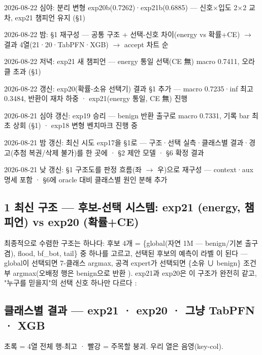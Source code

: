 2026-08-22 심야: 분리 변형 exp20b(0.7262)·exp21b(0.6885) — 신호×입도 2×2 교차, exp21 챔피언 유지 (§1)

2026-08-22 밤: §1 재구성 — 공통 구조 +\allowbreak{} 선택-신호 차이(energy vs 확률+\allowbreak{}CE)  \ensuremath{\rightarrow}  결과 4열(21·20·TabPFN·XGB)  \ensuremath{\rightarrow}  accept 차트 순

2026-08-22 저녁: exp21 새 챔피언 — energy 통일 선택(CE 無) macro 0.7411, 오라클 초과 (§1)

2026-08-22 갱신: exp20(확률-소유 선택기) 결과 §1 추가 — macro 0.7235·inf 최고 0.3484, 반환이 재차 하중 · exp21(energy 통일, CE 無) 진행

2026-08-21 심야 갱신: exp19 승리 — benign 반환 출구로 macro 0.7331, 기록 bar 최초 상회 (§1) · exp18 변형 벤치마크 진행 중

2026-08-21 밤 갱신: 최신 시도 exp17을 §1로 — 구조·선택 실측·클래스별 결과·경고(추첨 복권/\allowbreak{}삭제 불가)를 한 곳에 · §2 제안 모델 · §6 확정 결과

2026-08-21 낮 갱신: §1 구조도를 판정 흐름(좌 \ensuremath{\rightarrow} 우)으로 재구성 — context·aux 명세 포함 · §6에 oracle 대비 클래스별 원인 분해 추가

\subsection*{1 최신 구조 — 후보-선택 시스템: exp21 (energy, 챔피언) vs exp20 (확률+\allowbreak{}CE)}
최종적으로 수렴한 구조는 하나다: 후보 4개 =\allowbreak{} \{global(자연 1M — benign/\allowbreak{}기본 출구 겸), flood, bf\_\allowbreak{}bot, tail\} 중 하나를 고르고, 선택된 후보의 예측이 라벨 이 된다 — global이 선택되면 7-클래스 argmax, 공격 expert가 선택되면 \{소유 ∪ benign\} 조건부 argmax(오배정 행은 benign으로 반환 ). exp21과 exp20은 이 구조가 완전히 같고, "누구를 믿을지"의 선택 신호 하나만 다르다 :

\subsection*{클래스별 결과 — exp21 · exp20 · 그냥 TabPFN · XGB}
초록 =\allowbreak{} 4열 전체 행-최고 · 빨강 =\allowbreak{} 주목할 붕괴. 우리 열은 음영(key-col).

